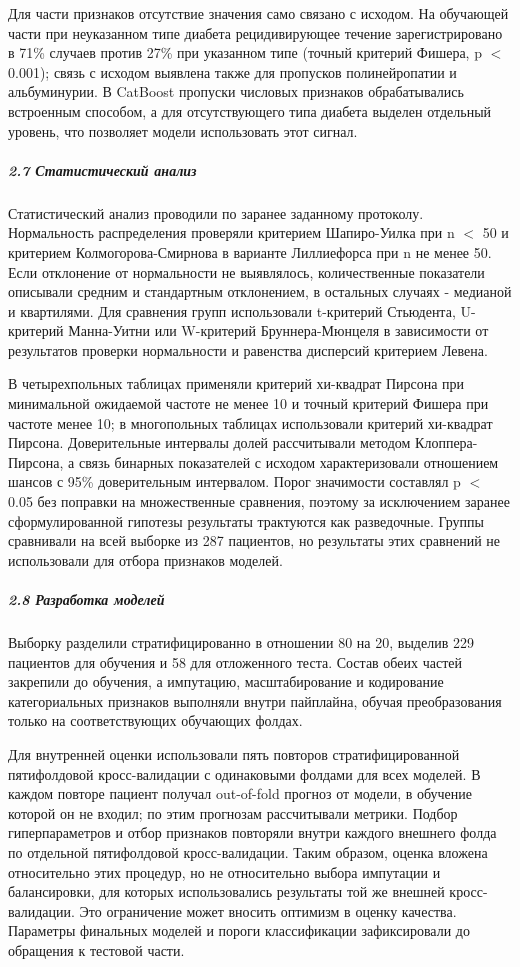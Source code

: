 \documentclass{crm-article}
\begin{document}
Для части признаков отсутствие значения само связано с исходом. На обучающей части при неуказанном типе диабета рецидивирующее течение зарегистрировано в 71\% случаев против 27\% при указанном типе (точный критерий Фишера, p $<$ 0.001); связь с исходом выявлена также для пропусков полинейропатии и альбуминурии. В CatBoost пропуски числовых признаков обрабатывались встроенным способом, а для отсутствующего типа диабета выделен отдельный уровень, что позволяет модели использовать этот сигнал.

\subparagraph{2.7 Статистический анализ}\label{subsec2_7}

Статистический анализ проводили по заранее заданному протоколу. Нормальность распределения проверяли критерием Шапиро-Уилка при n $<$ 50 и критерием Колмогорова-Смирнова в варианте Лиллиефорса при n не менее 50. Если отклонение от нормальности не выявлялось, количественные показатели описывали средним и стандартным отклонением, в остальных случаях - медианой и квартилями. Для сравнения групп использовали t-критерий Стьюдента, U-критерий Манна-Уитни или W-критерий Бруннера-Мюнцеля в зависимости от результатов проверки нормальности и равенства дисперсий критерием Левена.

В четырехпольных таблицах применяли критерий хи-квадрат Пирсона при минимальной ожидаемой частоте не менее 10 и точный критерий Фишера при частоте менее 10; в многопольных таблицах использовали критерий хи-квадрат Пирсона. Доверительные интервалы долей рассчитывали методом Клоппера-Пирсона, а связь бинарных показателей с исходом характеризовали отношением шансов с 95\% доверительным интервалом. Порог значимости составлял p $<$ 0.05 без поправки на множественные сравнения, поэтому за исключением заранее сформулированной гипотезы результаты трактуются как разведочные. Группы сравнивали на всей выборке из 287 пациентов, но результаты этих сравнений не использовали для отбора признаков моделей.

\subparagraph{2.8 Разработка моделей}\label{subsec2_8}

Выборку разделили стратифицированно в отношении 80 на 20, выделив 229 пациентов для обучения и 58 для отложенного теста. Состав обеих частей закрепили до обучения, а импутацию, масштабирование и кодирование категориальных признаков выполняли внутри пайплайна, обучая преобразования только на соответствующих обучающих фолдах.

Для внутренней оценки использовали пять повторов стратифицированной пятифолдовой кросс-валидации с одинаковыми фолдами для всех моделей. В каждом повторе пациент получал out-of-fold прогноз от модели, в обучение которой он не входил; по этим прогнозам рассчитывали метрики. Подбор гиперпараметров и отбор признаков повторяли внутри каждого внешнего фолда по отдельной пятифолдовой кросс-валидации. Таким образом, оценка вложена относительно этих процедур, но не относительно выбора импутации и балансировки, для которых использовались результаты той же внешней кросс-валидации. Это ограничение может вносить оптимизм в оценку качества. Параметры финальных моделей и пороги классификации зафиксировали до обращения к тестовой части.
\end{document}
